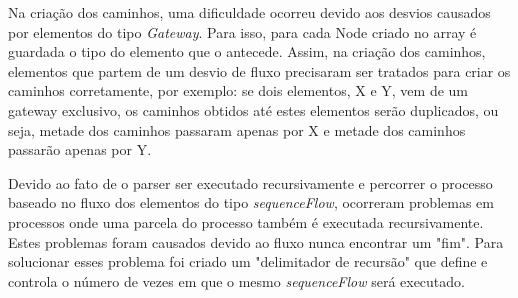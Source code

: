\documentclass[12pt]{article}
\begin{document}


Na criação dos caminhos, uma dificuldade ocorreu devido aos desvios causados por elementos do tipo \emph{Gateway}. Para isso, para cada Node criado no array é guardada o tipo do elemento que o antecede. Assim, na criação dos caminhos, elementos que partem de um desvio de fluxo precisaram ser tratados para criar os caminhos corretamente, por exemplo: se dois elementos, X e Y, vem de um gateway exclusivo, os caminhos obtidos até estes elementos serão duplicados, ou seja, metade dos caminhos passaram apenas por X e metade dos caminhos passarão apenas por Y.


Devido ao fato de o parser ser executado recursivamente e percorrer o processo baseado no fluxo dos elementos do tipo \emph{sequenceFlow}, ocorreram problemas em processos onde uma parcela do processo também é executada recursivamente. Estes problemas foram causados devido ao fluxo nunca encontrar um "fim". Para solucionar esses problema foi criado um "delimitador de recursão" que define e controla o número de vezes em que o mesmo \emph{sequenceFlow} será executado.
\end{document}
